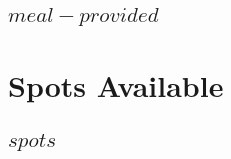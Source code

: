 \documentclass[letterpaper]{article}
\newcommand{\sectionspace}{\vspace{8pt}} %
\begin{document}
\begin{minipage}[t]{0.33\textwidth}
\subsection{$meal-provided$}

\sectionspace %

\sectionspace %




\section{Spots Available}

\subsection{$spots$}

\sectionspace %

\sectionspace %



\end{minipage} %
\hfill
%
%
\end{document}

